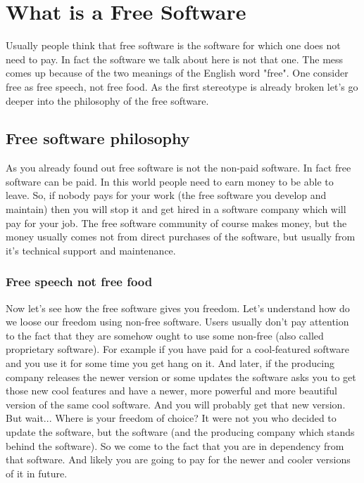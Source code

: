 
\chapter{What is a Free Software}
Usually people think that free software is the software for which one does not need to pay. In fact the software we talk about here is not that one. The mess comes up because of the two meanings of the English word "free". One consider free as free speech, not free food. As the first stereotype is already broken let's go deeper into the philosophy of the free software.

\section{Free software philosophy}
\label{philosophy}
As you already found out free software is not the non-paid software. In fact free software can be paid. In this world people need to earn money to be able to leave. So, if nobody pays for your work (the free software you develop and maintain) then you will stop it and get hired in a software company which will pay for your job. The free software community of course makes money, but the money usually comes not from direct purchases of the software, but usually from it's technical support and maintenance. 

\subsection{Free speech not free food}
Now let's see how the free software gives you freedom. Let's understand how do we loose our freedom using non-free software. Users usually don't pay attention to the fact that they are somehow ought to use some non-free (also called proprietary software). For example if you have paid for a cool-featured software and you use it for some time you get hang on it. And later, if the producing company releases the newer version or some updates the software asks you to get those new cool features and have a newer, more powerful and more beautiful version of the same cool software. And you will probably get that new version. But wait... Where is your freedom of choice? It were not you who decided to update the software, but the software (and the producing company which stands behind the software). So we come to the fact that you are in dependency from that software. And likely you are going to pay for the newer and cooler versions of it in future.


